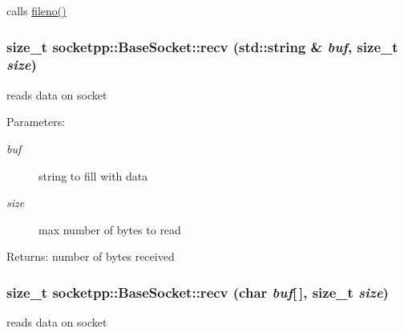 calls \hyperlink{classsocketpp_1_1BaseSocket_c96db07cc917926d895d89cf73734ea1}{fileno()} 

\hypertarget{classsocketpp_1_1BaseSocket_25fc62d259f6d12f1b1a5001a7512897}{
\subsubsection[{recv}]{\setlength{\rightskip}{0pt plus 5cm}size\_\-t socketpp::BaseSocket::recv (std::string \& {\em buf}, \/  size\_\-t {\em size})}}
\label{classsocketpp_1_1BaseSocket_25fc62d259f6d12f1b1a5001a7512897}


reads data on socket 

\begin{Desc}
\item[Parameters:]
\begin{description}
\item[{\em buf}]string to fill with data \item[{\em size}]max number of bytes to read \end{description}
\end{Desc}
\begin{Desc}
\item[Returns:]number of bytes received \end{Desc}
\hypertarget{classsocketpp_1_1BaseSocket_08b3e29d019575293fa134c6d91d6cbb}{
\subsubsection[{recv}]{\setlength{\rightskip}{0pt plus 5cm}size\_\-t socketpp::BaseSocket::recv (char {\em buf}\mbox{[}$\,$\mbox{]}, \/  size\_\-t {\em size})}}
\label{classsocketpp_1_1BaseSocket_08b3e29d019575293fa134c6d91d6cbb}


reads data on socket 

